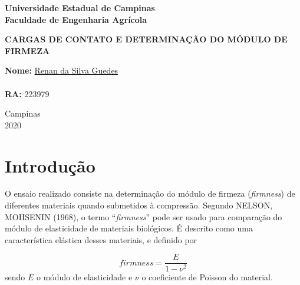 \documentclass[a4paper, brazilian]{article}
\begin{document}
\begin{titlepage}
		\begin{center}
			\begin{large}
				\textbf{Universidade Estadual de Campinas}\\\vspace{.5cm}
				\textbf{Faculdade de Engenharia Agrícola}\\\vspace{10.5cm}
			\end{large}
			\begin{large}
				\uppercase{\textbf{Cargas de contato e determinação do módulo de firmeza}}\\\vspace{4cm}
			\end{large}
		\end{center}
		\begin{large}
			\noindent\textbf{Nome:} \href{https://github.com/RenanSGuedes/576}{Renan da Silva Guedes}\\\\
			\noindent\textbf{RA:} 223979\\\vspace{5cm}
		\end{large}
		\begin{center}
			\begin{large}
				Campinas\\\vspace{.3cm}
				2020
			\end{large}
		\end{center}
	\end{titlepage}
	
	\newpage
	
	\section{Introdução}
	
	O ensaio realizado consiste na determinação do módulo de firmeza (\textit{firmness}) de diferentes materiais quando submetidos à compressão.
	Segundo NELSON, MOHSENIN (1968), o termo ``\textit{firmness}''
	pode ser usado para comparação do módulo de elasticidade de materiais biológicos. É descrito como uma característica elástica desses materiais, e definido por
	
	\begin{equation}
		\textit{firmness}=\dfrac{E}{1-\nu^{2}}
	\end{equation}
	sendo $E$ o módulo de elasticidade e $\nu$ o coeficiente de Poisson do material.
	
\end{document}
